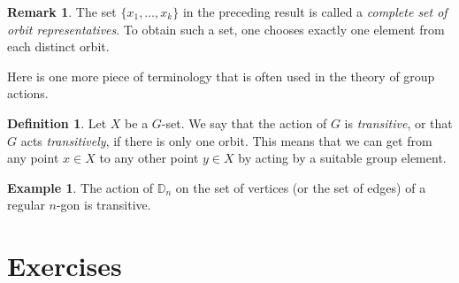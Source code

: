 \documentclass[11pt,oneside]{article}
\theoremstyle{definition}
\newtheorem{defn}[thm]{Definition}
\newtheorem{example}[thm]{Example}
\newtheorem{rmk}[thm]{Remark}
\newcommand{\D}{\mathbb{D}}
\begin{document}
\begin{rmk}
The set $\{x_1, \dots, x_k\}$ in the preceding
result is called a \emph{complete set of orbit representatives}. To
obtain such a set, one chooses exactly one element from each distinct
orbit.
\end{rmk}

Here is one more piece of terminology that is often used in the theory
of group actions.


\begin{defn}
Let $X$ be a $G$-set. We say that the action of $G$ is {\em
  transitive}, or that $G$ acts \emph{transitively}, if there is only
one orbit. This means that we can get from any point $x \in X$ to any
other point $y \in X$ by acting by a suitable group element.
\end{defn}


\begin{example}
  The action of $\D_n$ on the set of vertices (or the set of edges) of
  a regular $n$-gon is transitive.
\end{example}


\section*{Exercises}
\end{document}
